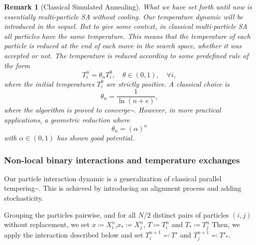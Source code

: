 \documentclass[10pt,a4paper]{article}
\theoremstyle{theorem}
\newtheorem{remark}{Remark}[section]
\numberwithin{equation}{section}
\begin{document}
\begin{remark}[Classical Simulated Annealing]
What we have set forth until now is essentially multi-particle SA without cooling. Our temperature dynamic will be introduced in the sequel. But to give some context, in classical multi-particle SA all particles have the same temperature. This means that the temperature of each particle is reduced at the end of each move in the search space, whether it was accepted or not. The temperature is reduced according to some predefined rule of the form
\begin{equation}
T^n_i=\theta_n T^0_i, \quad\theta\in(0,1),\quad \forall i,
\end{equation}
where the initial temperatures $T^0_i$ are strictly positive. A classical choice is
\begin{equation}
\label{eq:temp}
\theta_n=\frac{1}{\ln(n+e)},
\end{equation}
where the algorithm is proved to converge^^>\cite{hajek_cooling_1988,pareschi_optimization_2024}. However, in more practical applications, a geometric reduction where 
\begin{equation}
\theta_n=(\alpha)^n
\end{equation} 
with $\alpha \in (0,1)$ has shown good potential.
\end{remark}

\subsubsection{Non-local binary interactions and temperature exchanges}
\label{subsec:particle_Qff}
Our particle interaction dynamic is a generalization of classical parallel tempering^^>\cite{earl_parallel_2005}. This is achieved by introducing an alignment process and adding stochasticity. 

Grouping the particles pairwise, and for all $N/2$ distinct pairs of particles $(i,j)$ without replacement, we set $x\coloneqq X^n_i$,$x_*\coloneqq X^n_j$, $T\coloneqq T^n_i$ and $T_*\coloneqq T^n_j$
Then, we apply the interaction described below and set $T^{n+1}_i\eqqcolon T'$ and $T^{n+1}_j\eqqcolon T'_*$.
\end{document}
